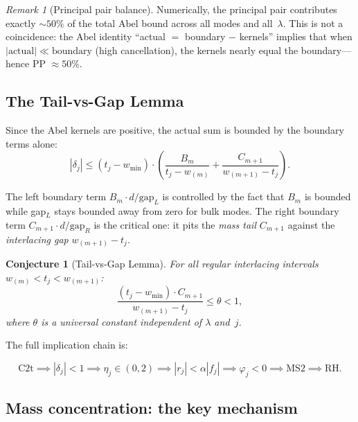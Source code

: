 \documentclass[12pt,a4paper]{article}
\newtheorem{conjecture}[theorem]{Conjecture}
\theoremstyle{definition}
\theoremstyle{remark}
\newtheorem{remark}[theorem]{Remark}
\newcommand{\wmin}{w_{\min}}
\begin{document}
\begin{remark}[Principal pair balance]
Numerically, the principal pair contributes exactly $\sim 50\%$
of the total Abel bound across all modes and all~$\lambda$.
This is not a coincidence: the Abel identity
``actual $=$ boundary $-$ kernels'' implies that when $|\text{actual}|
\ll \text{boundary}$ (high cancellation), the kernels nearly equal
the boundary---hence PP $\approx 50\%$.
\end{remark}

\subsection{The Tail-vs-Gap Lemma}

Since the Abel kernels are positive, the actual sum is bounded by
the boundary terms alone:
\begin{equation}
|\delta_j| \leq (t_j - \wmin) \cdot
\left(\frac{B_m}{t_j - w_{(m)}} + \frac{C_{m+1}}{w_{(m+1)} - t_j}\right).
\end{equation}

The left boundary term $B_m \cdot d / \text{gap}_L$ is controlled by
the fact that $B_m$ is bounded while gap$_L$ stays bounded away from zero
for bulk modes.
The right boundary term $C_{m+1} \cdot d / \text{gap}_R$ is the
critical one: it pits the \emph{mass tail} $C_{m+1}$ against the
\emph{interlacing gap} $w_{(m+1)} - t_j$.

\begin{conjecture}[Tail-vs-Gap Lemma]
\label{conj:tvg}
For all regular interlacing intervals $w_{(m)} < t_j < w_{(m+1)}$:
\begin{equation}
\label{eq:tvg}
\frac{(t_j - \wmin) \cdot C_{m+1}}{w_{(m+1)} - t_j} \leq \theta < 1,
\end{equation}
where $\theta$ is a universal constant independent of $\lambda$ and~$j$.
\end{conjecture}

The full implication chain is:

\begin{equation}
\label{eq:chain}
\boxed{
\text{C2t}
\implies |\delta_j| < 1
\implies \eta_j \in (0,2)
\implies |r_j| < \alpha |f_j|
\implies \varphi_j < 0
\implies \text{MS2}
\implies \text{RH}.
}
\end{equation}

\subsection{Mass concentration: the key mechanism}
\end{document}
